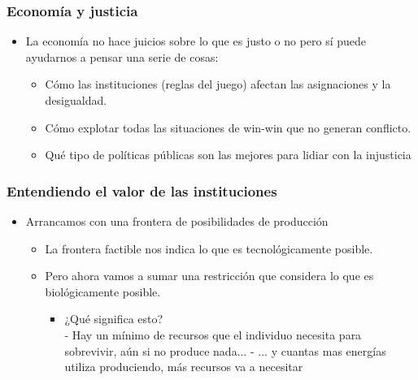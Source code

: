 \documentclass{beamer}
\begin{document}
\begin{frame}
\frametitle{Economía y justicia}
\begin{itemize}
    \item La economía no hace juicios sobre lo que es justo o no pero sí puede ayudarnos a pensar una serie de cosas: \vspace{2mm}
    \begin{itemize}
        \item Cómo las instituciones (reglas del juego) afectan las asignaciones y la desigualdad.\vspace{2mm}
        \item  Cómo explotar todas las situaciones de win-win que no generan conflicto.\vspace{2mm}
        \item Qué tipo de políticas públicas son las mejores para lidiar con la injusticia
    \end{itemize}
\end{itemize}\end{frame}


\begin{frame}
\frametitle{Entendiendo el valor de las instituciones}
\begin{itemize}
    \item Arrancamos con una frontera de posibilidades de producción \vspace{4mm}
        \begin{itemize}
        \item La frontera factible nos indica lo que es tecnológicamente posible. \vspace{2mm}
        \item Pero ahora vamos a sumar una restricción que considera lo que es biológicamente posible.
        \begin{itemize} \vspace{4mm}
            \item ¿Qué significa esto? \\
            - Hay un mínimo de recursos que el individuo necesita para sobrevivir, aún si no produce nada...
            - ... y cuantas mas energías utiliza produciendo, más recursos va a necesitar
        \end{itemize}
    \end{itemize}
\end{itemize}
\end{frame}
\end{document}
